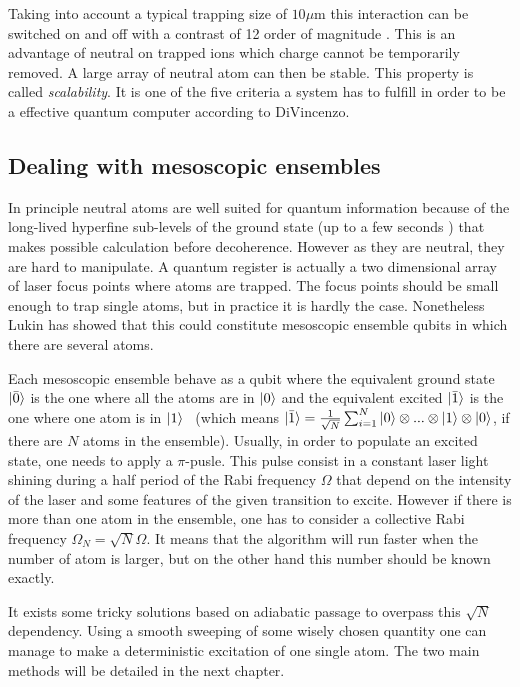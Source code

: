 \documentclass[%
]{scrreprt}
\newcommand{\g}{\ensuremath{\ket{0}}\xspace}
\newcommand{\e}{\ensuremath{\ket{1}}\xspace}
\newcommand{\Om}{\Omega}
\begin{document}
\par Taking into account a typical trapping size of $10\mu$m this interaction can be switched on and off with a contrast of 12 order of magnitude \cite{Saff-rev}. This is an advantage of neutral on trapped ions which charge cannot be temporarily removed. A large array of neutral atom can then be stable. This property is called \emph{scalability}. It is one of the five criteria a system has to fulfill in order to be a effective quantum computer according to DiVincenzo.

\subsection{Dealing with mesoscopic ensembles}

\par In principle neutral atoms are well suited for quantum information because of the long-lived hyperfine sub-levels of the ground state (up to a few seconds \cite{Lukin}) that makes possible calculation before decoherence. However as they are neutral, they are hard to manipulate. A quantum register is actually a two dimensional array of laser focus points where atoms are trapped. The focus points should be small enough to trap single atoms, but in practice it is hardly the case. Nonetheless Lukin has showed that this could constitute mesoscopic ensemble qubits in which there are several atoms.

\par Each mesoscopic ensemble behave as a qubit where the equivalent ground state $\ket{\bar{0}}$ is the one where all the atoms are in \g and the equivalent excited $\ket{\bar{1}}$ is the one where one atom is in \e ~ (which means $\ket{\bar{1}} = \frac{1}{\sqrt{N}} \sum_{i=1}^N \g \otimes ... \otimes \e \otimes \g$, if there are $N$ atoms in the ensemble). Usually, in order to populate an excited state, one needs to apply a $\pi$-pusle. This pulse consist in a constant laser light shining during a half period of the Rabi frequency $\Om$ that depend on the intensity of the laser and some features of the given transition to excite. However if there is more than one atom in the ensemble, one has to consider a collective Rabi frequency $\Om_N = \sqrt{N} \Om$. It means that the algorithm will run faster when the number of atom is larger, but on the other hand this number should be known exactly.

\par It exists some tricky solutions based on adiabatic passage to overpass this $\sqrt{N}$ dependency. Using a smooth sweeping of some wisely chosen quantity one can manage to make a deterministic excitation of one single atom. The two main methods will be detailed in the next chapter.
\end{document}
